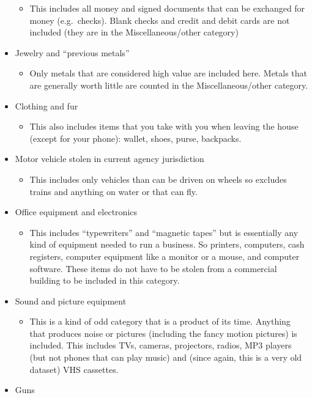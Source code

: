 \documentclass[
  12pt,
  openany]{book}
\providecommand{\tightlist}{%
  \setlength{\itemsep}{0pt}\setlength{\parskip}{0pt}}
\begin{document}
\begin{itemize}
  \begin{itemize}
  \tightlist
  \item
    This includes all money and signed documents that can be exchanged for money (e.g.~checks). Blank checks and credit and debit cards are not included (they are in the Miscellaneous/other category)
  \end{itemize}
\item
  Jewelry and ``previous metals''

  \begin{itemize}
  \tightlist
  \item
    Only metals that are considered high value are included here. Metals that are generally worth little are counted in the Miscellaneous/other category.
  \end{itemize}
\item
  Clothing and fur

  \begin{itemize}
  \tightlist
  \item
    This also includes items that you take with you when leaving the house (except for your phone): wallet, shoes, purse, backpacks.
  \end{itemize}
\item
  Motor vehicle stolen in current agency jurisdiction

  \begin{itemize}
  \tightlist
  \item
    This includes only vehicles than can be driven on wheels so excludes trains and anything on water or that can fly.
  \end{itemize}
\item
  Office equipment and electronics

  \begin{itemize}
  \tightlist
  \item
    This includes ``typewriters'' and ``magnetic tapes'' but is essentially any kind of equipment needed to run a business. So printers, computers, cash registers, computer equipment like a monitor or a mouse, and computer software. These items do not have to be stolen from a commercial building to be included in this category.
  \end{itemize}
\item
  Sound and picture equipment

  \begin{itemize}
  \tightlist
  \item
    This is a kind of odd category that is a product of its time. Anything that produces noise or pictures (including the fancy motion pictures) is included. This includes TVs, cameras, projectors, radios, MP3 players (but not phones that can play music) and (since again, this is a very old dataset) VHS cassettes.
  \end{itemize}
\item
  Guns


\end{itemize}
\end{document}
